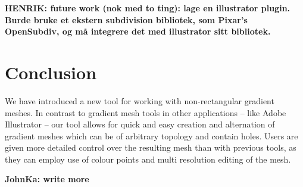 \documentclass{egpubl}
\newcommand{\note}[3]{{\color{#2}\textbf{#1: #3}}}
\newcommand{\henrik}[1]{\note{HENRIK}{WildStrawberry}{#1}}
\newcommand{\john}[1]{\note{JohnKa}{RubineRed}{#1}}
\begin{document}
\henrik{future work (nok med to ting): lage en illustrator plugin. Burde bruke et ekstern subdivision bibliotek, som Pixar's OpenSubdiv, og må integrere det med illustrator sitt bibliotek.}

\section{Conclusion}

We have introduced a new tool for working with non-rectangular gradient meshes. In contrast to gradient mesh tools in other applications -- like Adobe Illustrator -- our tool allows for quick and easy creation and alternation of gradient meshes which can be of arbitrary topology and contain holes. Users are given more detailed control over the resulting mesh than with previous tools, as they can employ use of colour points and multi resolution editing of the mesh.

\john{write more}




\end{document}
